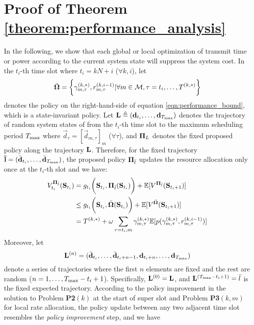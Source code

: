 \section{ Proof of Theorem \ref{theorem:performance_analysis} }
\label{append_3}
In the following, we show that each global or local optimization of transmit time or power according to the current system state will suppress the system cost.
In the $t_i$-th time slot where $t_i=kN+i$ ($\forall k,i$),
let 
\begin{align*}
    \bar{\boldsymbol{\Omega}} = \bigg\{ \gamma^{(k,*)}_{m,\tau}, r^{(k,i-1)}_{m,\tau} | \forall m\in\mathcal{M}, \tau=t_i,\dots,T^{(k,*)} \bigg\}
\end{align*}
denotes the policy on the right-hand-side of equation \eqref{eqn:performance_bound}, which is a state-invariant policy.
Let $\mathbf{L} \triangleq ( \mathbf{d}_{t_i}, \dots, \mathbf{d}_{{T_{\max}}} )$
denotes the trajectory of random system states of {\IAVs} from the $t_i$-th time slot to the maximum scheduling period ${T_{\max}}$ where $\vec{d}_{\tau} = [ \vec{d}_{m,\tau} ]_m$ ($\forall \tau$),
and $\mathbf{\Pi}_{L}$ denotes the fixed proposed policy along the trajectory $\mathbf{L}$.
Therefore, for the fixed trajectory $\mathbf{\bar{l}} = ( \bar{\mathbf{d}}_{t_i}, \dots, \bar{\mathbf{d}}_{{T_{\max}}} )$, the proposed policy $\mathbf{\Pi}_{\bar{l}}$ updates the resource allocation only once at the $t_i$-th slot and we have:
\begin{align*}
    V^{\mathbf{\Pi}_{\bar{l}}}_{t_i}( \mathbf{S}_{t_i} ) &= g_{t_i}\bigg( \mathbf{S}_{t_i}, \mathbf{\Pi}_{\bar{l}}(\mathbf{S}_{t_i}) \bigg) + \mathbb{E}[ V^{ \mathbf{\Pi}_{\bar{l}} }( \mathbf{S}_{t_i+1} ) ]
    \nonumber\\
    &\leq g_{t_i}\bigg( \mathbf{S}_{t_i}, \bar{\boldsymbol{\Omega}}(\mathbf{S}_{t_i}) \bigg) + \mathbb{E}[ V^{ \bar{\boldsymbol{\Omega}} }( \mathbf{S}_{t_i+1} ) ]
    \nonumber\\
    &= T^{(k,*)} + \omega \sum_{\tau=t_i, m} \gamma^{(k,*)}_{m,\tau} \mathbb{E}[ p( \gamma^{(k,*)}_{m,\tau}, r^{(k,i-1)}_{m,\tau} ) ]
\end{align*}
Moreover, let
$$
\mathbf{L}^{(n)} = ( \bar{\mathbf{d}}_{t_i}, \dots, \bar{\mathbf{d}}_{t_i+n-1}, \mathbf{d}_{t_i+n}, \dots,  \mathbf{d}_{{T_{\max}}})
$$
denote a series of trajectories where the first $n$ elements are fixed and the rest are random ($n=1,\dots,{T_{\max}}-t_i+1$).
Specifically, $\mathbf{L}^{(0)} = \mathbf{L}$, and $\mathbf{L}^{({T_{\max}}-t_i+1)} = \bar{l}$ is the fixed expected trajectory.
According to the policy improvement in the solution to Problem \textbf{P2$(k)$} at the start of super slot and Problem \textbf{P3$(k,m)$} for local rate allocation, the policy update between any two adjacent time slot resembles the \emph{policy improvement} step, and we have
